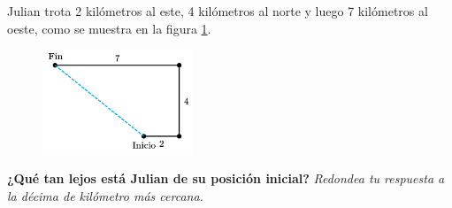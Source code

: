 \question[15]  Julian trota 2 kilómetros al este, 4 kilómetros al norte y luego 7 kilómetros al oeste,
como se muestra en la figura \ref{fig:des_pitagoras_08}.

\begin{figure}[H]
    \begin{center}
        \includegraphics[width=0.4\textwidth]{../images/des_pitagoras_08.png}
    \end{center}
    \caption{}
    \label{fig:des_pitagoras_08}
\end{figure}

\textbf{¿Qué tan lejos está Julian de su posición inicial?}
\textit{Redondea tu respuesta a la décima de kilómetro más cercana.}
